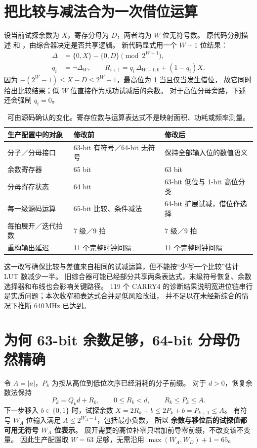 \section{把比较与减法合为一次借位运算}
设当前试探余数为 $X$，寄存分母为 $D$，两者均为 $W$ 位无符号数。
原代码分别描述  和 ，由综合器决定是否共享逻辑。
新代码显式用一个 $W+1$ 位结果：
\begin{align}
\Delta&=\{0,X\}-\{0,D\}\pmod{2^{W+1}},\\
q_i&=\neg \Delta_W,\qquad
R_{i+1}=q_i\,\Delta_{W-1:0}+(1-q_i)X.
\end{align}
因为 $-(2^W-1)\le X-D\le2^W-1$，最高位为 1 当且仅当发生借位，
故它同时给出比较结果；低 $W$ 位直接作为成功试减后的余数。
对于高位分母旁路，下述  还会强制 $q_i=0$。

\begin{table}[H]\centering\small
\begin{tabularx}{\textwidth}{p{36mm}XX}\toprule
生产配置中的对象&修改前&修改后\\\midrule
分子／分母接口&63-bit 有符号／64-bit 无符号&保持全部输入位的数值语义\\
余数寄存器&65 bit&63 bit\\
分母寄存状态&64 bit&63-bit 低位与 1-bit 高位分类\\
每一级源码运算&65-bit 比较、条件减法&64-bit 扩展试减，借位作选择\\
每拍展开／迭代拍数&7 级／9 拍&7 级／9 拍\\
重构输出延迟&11 个完整时钟间隔&11 个完整时钟间隔\\
\bottomrule\end{tabularx}
\caption{可由源码确认的变化。寄存位数与运算表达式不是映射面积、功耗或频率测量。}
\end{table}

这一改写确保比较与差值来自相同的试减运算，但不能按“少写一个比较”估计 LUT 数减少一半。
旧综合器可能已经部分共享两条表达式，末级符号恢复、余数选择器和布线也会影响关键路径。
119 个 CARRY4 的诊断结果说明宽进位链串行是实质问题；本次收窄和表达式合并是低风险改进，
并不足以在未经新综合的情况下推断 640\,MHz 已达到。

\section{为何 63-bit 余数足够，64-bit 分母仍然精确}
令 $A=|a|$，$P_k$ 为按从高位到低位次序已经消耗的分子前缀。
对于 $d>0$，恢复余数法保持
\begin{equation}
P_k=Q_kd+R_k,\qquad 0\le R_k<d,\qquad R_k\le P_k\le A.
\end{equation}
下一步移入 $b\in\{0,1\}$ 时，试探余数
\(X=2R_k+b\le2P_k+b=P_{k+1}\le A\)。
有符号 $W_A$ 位输入满足 $A\le2^{W_A-1}$，包括最小负数，
所以 \textbf{余数与移位后的试探值都可用无符号 $W_A$ 位表示}。
展开需要的高位补零只增加前导零前缀，不改变该不变量。
因此生产配置取 $W=63$ 足够，无需沿用 $\max(W_A,W_D)+1=65$。

